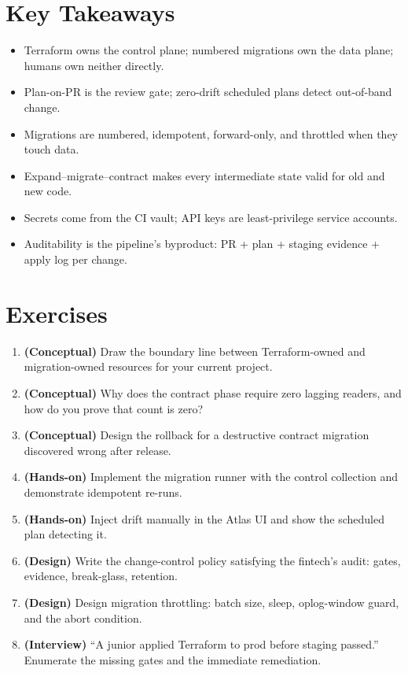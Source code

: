 \section*{Key Takeaways}
\begin{itemize}
    \item Terraform owns the control plane; numbered migrations own the data plane; humans own neither directly.
    \item Plan-on-PR is the review gate; zero-drift scheduled plans detect out-of-band change.
    \item Migrations are numbered, idempotent, forward-only, and throttled when they touch data.
    \item Expand--migrate--contract makes every intermediate state valid for old and new code.
    \item Secrets come from the CI vault; API keys are least-privilege service accounts.
    \item Auditability is the pipeline's byproduct: PR + plan + staging evidence + apply log per change.
\end{itemize}

\section{Exercises}
\begin{enumerate}
    \item \textbf{(Conceptual)} Draw the boundary line between Terraform-owned and migration-owned resources for your current project.
    \item \textbf{(Conceptual)} Why does the contract phase require zero lagging readers, and how do you prove that count is zero?
    \item \textbf{(Conceptual)} Design the rollback for a destructive contract migration discovered wrong after release.
    \item \textbf{(Hands-on)} Implement the migration runner with the control collection and demonstrate idempotent re-runs.
    \item \textbf{(Hands-on)} Inject drift manually in the Atlas UI and show the scheduled plan detecting it.
    \item \textbf{(Design)} Write the change-control policy satisfying the fintech's audit: gates, evidence, break-glass, retention.
    \item \textbf{(Design)} Design migration throttling: batch size, sleep, oplog-window guard, and the abort condition.
    \item \textbf{(Interview)} ``A junior applied Terraform to prod before staging passed.'' Enumerate the missing gates and the immediate remediation.
\end{enumerate}

